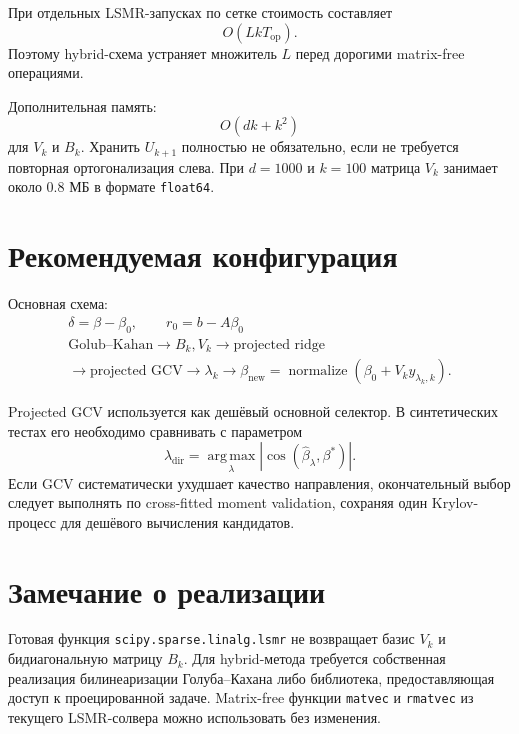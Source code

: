 \documentclass[11pt,a4paper]{article}
\newcommand{\argmax}{\operatorname*{arg\,max}}
\begin{document}
При отдельных LSMR-запусках по сетке стоимость составляет
\[
    O(LkT_{\mathrm{op}}).
\]
Поэтому hybrid-схема устраняет множитель \(L\) перед дорогими
matrix-free операциями.

Дополнительная память:
\[
    O(dk+k^2)
\]
для \(V_k\) и \(B_k\).
Хранить \(U_{k+1}\) полностью не обязательно, если не требуется повторная
ортогонализация слева. При \(d=1000\) и \(k=100\) матрица \(V_k\) занимает
около \(0.8\) МБ в формате \texttt{float64}.

\section{Рекомендуемая конфигурация}

Основная схема:
\[
\boxed{
\begin{gathered}
    \delta=\beta-\beta_0,\qquad r_0=b-A\beta_0
    \\
    \text{Golub--Kahan}
    \longrightarrow
    B_k,V_k
    \longrightarrow
    \text{projected ridge}
    \\
    \longrightarrow
    \text{projected GCV}
    \longrightarrow
    \lambda_k
    \longrightarrow
    \beta_{\mathrm{new}}
    =
    \operatorname{normalize}
    \left(
        \beta_0+V_ky_{\lambda_k,k}
    \right).
\end{gathered}
}
\]

Projected GCV используется как дешёвый основной селектор.
В синтетических тестах его необходимо сравнивать с параметром
\[
    \lambda_{\mathrm{dir}}
    =
    \argmax_\lambda
    \left|
        \cos(\widehat\beta_\lambda,\beta^\ast)
    \right|.
\]
Если GCV систематически ухудшает качество направления, окончательный выбор
следует выполнять по cross-fitted moment validation, сохраняя один
Krylov-процесс для дешёвого вычисления кандидатов.

\section{Замечание о реализации}

Готовая функция \texttt{scipy.sparse.linalg.lsmr} не возвращает базис \(V_k\)
и бидиагональную матрицу \(B_k\). Для hybrid-метода требуется собственная
реализация билинеаризации Голуба--Кахана либо библиотека, предоставляющая
доступ к проецированной задаче. Matrix-free функции \texttt{matvec} и
\texttt{rmatvec} из текущего LSMR-солвера можно использовать без изменения.
\end{document}

